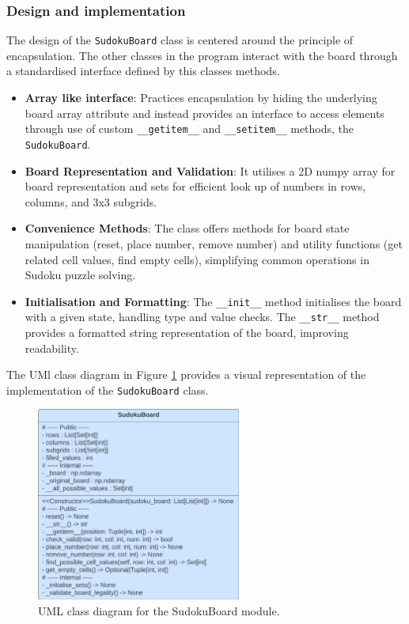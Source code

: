 \documentclass[11pt]{article}
\begin{document}
\begin{itemize}
\begin{itemize}
\end{itemize}
\subsubsection{Design and implementation}
The design of the \texttt{SudokuBoard} class is centered around the principle of encapsulation. The other classes in the program interact with the board through a standardised interface defined by this classes methods. 
\begin{itemize}
    \item \textbf{Array like interface}: Practices encapsulation by hiding the underlying board array attribute and instead provides an interface to access elements through use of custom
    \texttt{\_\_getitem\_\_} and \texttt{\_\_setitem\_\_} methods, the \texttt{SudokuBoard}.
    \item \textbf{Board Representation and Validation}: It utilises a 2D numpy array for board representation and sets for efficient look up of numbers in rows, columns, and 3x3 subgrids. 

    \item \textbf{Convenience Methods}: The class offers methods for board state manipulation (reset, place number, remove number) and utility functions (get related cell values, find empty cells), simplifying common operations in Sudoku puzzle solving.
    
    \item \textbf{Initialisation and Formatting}: The \texttt{\_\_init\_\_} method initialises the board with a given state, handling type and value checks. The \texttt{\_\_str\_\_} method provides a formatted string representation of the board, improving readability.

\end{itemize}

The UMl class diagram in Figure \ref{fig:sudoku_board_uml} provides a visual representation of the implementation of the \texttt{SudokuBoard} class.

\begin{figure}[H]
    \centering
    \includegraphics[width=0.6\textwidth]{figs/UML_sudoku_board.png}
    \caption{UML class diagram for the SudokuBoard module.}
    \label{fig:sudoku_board_uml}
\end{figure}
 

\end{itemize}
\end{document}
